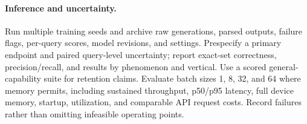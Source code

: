 \paragraph{Inference and uncertainty.}
Run multiple training seeds and archive raw generations, parsed outputs, failure flags, per-query scores, model revisions, and settings. Prespecify a primary endpoint and paired query-level uncertainty; report exact-set correctness, precision/recall, and results by phenomenon and vertical. Use a scored general-capability suite for retention claims. Evaluate batch sizes 1, 8, 32, and 64 where memory permits, including sustained throughput, p50/p95 latency, full device memory, startup, utilization, and comparable API request costs. Record failures rather than omitting infeasible operating points.
